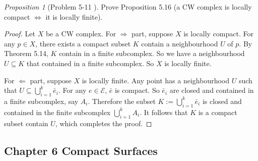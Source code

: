 \documentclass[a4paper]{article}
\theoremstyle{remark}
\newtheorem{prop}{Proposition}
\newcommand{\subhim}{\subseteq} %
\begin{document}
\begin{prop}[Problem 5-11 \cite{LeeTM}]
	Prove Proposition 5.16 (a CW complex is locally compact $\Leftrightarrow$ it is locally finite).
\end{prop}
\begin{proof}
	Let $X$ be a CW complex. For $\Rightarrow$ part, suppose $X$ is locally compact. For any $p\in X$, there exists a compact subset $K$ contain a neighbourhood $U$ of $p$. By Theorem 5.14, $K$ contain in a finite subcomplex. So we have a neighbourhood $U \subhim K$ that contained in a finite subcomplex. So $X$ is locally finite.
	
	For $\Leftarrow$ part, suppose $X$ is locally finite. Any point has a neighbourhood $U$ such that $U \subhim \bigcup_{i=1}^k \bar{e}_i$. For any $e \in \mathcal{E}$,  $\bar{e}$ is compact. So $\bar{e}_i$ are closed and contained in a finite subcomplex, say $A_i$. Therefore the subset $K:=\bigcup_{i=1}^k \bar{e}_i$ is closed and contained in the finite subcomplex $\bigcup_{i=1}^k A_i$. It follows that $K$ is a compact subset contain $U$, which completes the proof.
\end{proof}

\subsection*{Chapter 6 Compact Surfaces}
 
\end{document}
